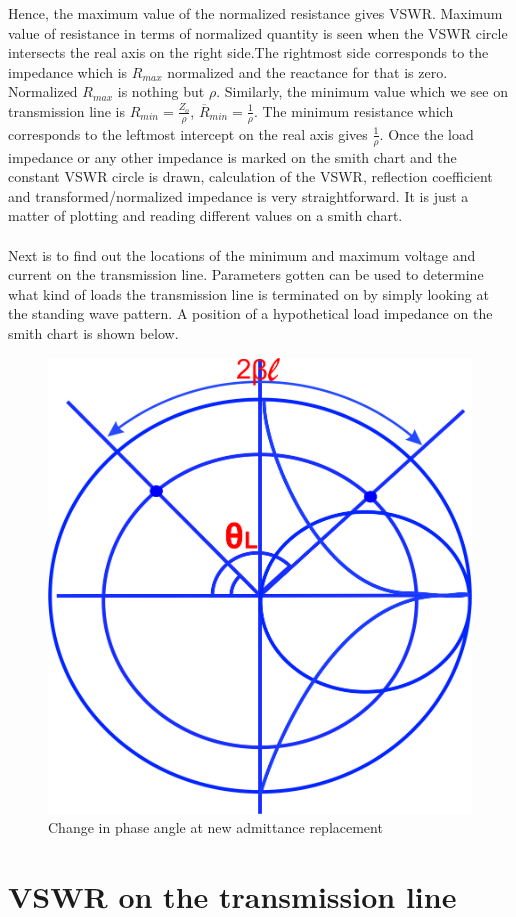 Hence, the maximum value of the normalized resistance gives VSWR. Maximum value of resistance in terms of normalized quantity is seen when the VSWR circle intersects the real axis on the right side.The rightmost side corresponds to the impedance which is $R_{max}$ normalized and the reactance for that is zero. Normalized $R_{max}$ is nothing but $\rho$. Similarly, the minimum value which we see on transmission line is $R_{min} = \frac{Z_o}{\rho}$, $\overline{R}_{min} = \frac{1}{\rho}$. The minimum resistance which corresponds to the leftmost intercept on the real axis gives $\frac{1}{\rho}$. Once the load impedance or any other impedance is marked on the smith chart and the constant VSWR circle is drawn, calculation of the VSWR, reflection coefficient and transformed/normalized impedance is very straightforward. It is just a matter of plotting and reading different values on a smith chart.\\\\
Next is to find out the locations of the  minimum and maximum voltage and current on the transmission line. Parameters gotten can be used to determine what kind of loads the transmission line is terminated on by simply looking at the standing wave pattern. A position of a hypothetical load impedance on the smith chart is shown below.
\begin{figure}[h]
\centering
\includegraphics[width=0.4\linewidth]{./graphics/dfyui}
\caption{Change in phase angle at new admittance replacement}
\label{fig:dfyui}
\end{figure}


\section{VSWR on the transmission line}


